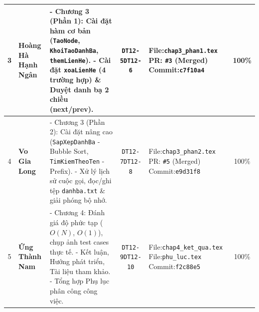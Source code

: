 \documentclass[12pt,a4paper]{report}
\begin{document}
\begin{table}[H]
\begin{tabularx}{\textwidth}{|c|>{\raggedright\arraybackslash}p{2.0cm}|X|c|>{\raggedright\arraybackslash}p{2.7cm}|c|}
3 & \textbf{Hoàng Hà Hạnh Ngân}
  & - Chương 3 (Phần 1): Cài đặt hàm cơ bản (\texttt{TaoNode}, \texttt{KhoiTaoDanhBa}, \texttt{themLienHe}).\newline
    - Cài đặt \texttt{xoaLienHe} (4 trường hợp) \& Duyệt danh bạ 2 chiều (next/prev).
  & \texttt{DT12-5}\newline \texttt{DT12-6}
  & File:\newline \texttt{\small chap3\_phan1.tex}\newline
    PR: \texttt{\small \#3} (Merged)\newline
    Commit:\newline \texttt{\small c7f10a4}
  & 100\% \\ \hline

4 & \textbf{Vo Gia Long}
  & - Chương 3 (Phần 2): Cài đặt nâng cao (\texttt{SapXepDanhBa} - Bubble Sort, \texttt{TimKiemTheoTen} - Prefix).\newline
    - Xử lý lịch sử cuộc gọi, đọc/ghi tệp \texttt{danhba.txt} \& giải phóng bộ nhớ.
  & \texttt{DT12-7}\newline \texttt{DT12-8}
  & File:\newline \texttt{\small chap3\_phan2.tex}\newline
    PR: \texttt{\small \#5} (Merged)\newline
    Commit:\newline \texttt{\small e9d31f8}
  & 100\% \\ \hline

5 & \textbf{Ứng Thành Nam}
  & - Chương 4: Đánh giá độ phức tạp ($O(N)$, $O(1)$), chụp ảnh test cases thực tế.\newline
    - Kết luận, Hướng phát triển, Tài liệu tham khảo.\newline
    - Tổng hợp Phụ lục phân công công việc.
  & \texttt{DT12-9}\newline \texttt{DT12-10}
  & File:\newline \texttt{\small chap4\_ket\_qua.tex}\newline
    File:\newline \texttt{\small phu\_luc.tex}\newline
    Commit:\newline \texttt{\small f2c88e5}
  & 100\% \\ \hline

\end{tabularx}
\end{table}
\end{document}
